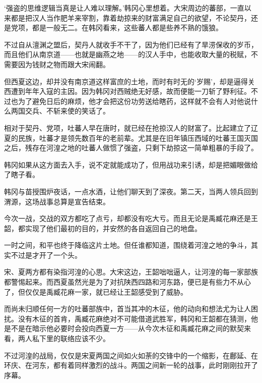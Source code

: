 ‘强盗的思维逻辑当真是让人难以理解。’韩冈心里想着。大宋周边的蕃部，一直以来都是把汉人当作肥羊来宰割，靠着劫掠来的财富满足自己的欲望，不论契丹，还是党项，都是一般无二。在韩冈看来，这些蕃人都是些养不熟的饿狼。

不过自从澶渊之盟后，契丹人就收手不干了，因为他们已经有了旱涝保收的岁币，而且他们从南京道——也就是幽燕之地——的汉人手中，也能收取大量的税赋，不需要因为钱财之物而跟大宋闹翻。

但西夏这边，却并没有南京道这样富庶的土地，而时有时无的‘岁赐’，却是逼得关西遭到年年入寇的主因。因为韩冈对西贼绝无好感，故而便能一刀斩了野利征。不过也为了避免日后的麻烦，他才会把这份功劳送给瞎药，这样就不会有人对他说什么两国交兵、不斩来使的笑话了。

相对于契丹、党项，吐蕃人早在唐时，就已经在抢掠汉人的财富了。比起建立了辽夏的民族，吐蕃才是领先数百年的老前辈。尤其是在旧年镇压西域的吐蕃王国灭国之后，残存在河湟之地的吐蕃人做惯了强盗，只剩下劫掠这一简单粗暴的手段了。

韩冈如果从这方面去入手，说不定就能成功了，但用战功来引诱，却是把媚眼做给了瞎子看。

韩冈与苗授围炉夜话，一点水酒，让他们聊天到了深夜。第二天，当两人领兵回到渭源，这场战事总算是宣告结束。

今次一战，交战的双方都吃了点亏，却都没有吃大亏。而且无论是禹臧花麻还是王韶，都实现了他们最初的目的，并安然的各自返回自己的地盘。

一时之间，和平也终于降临这片土地。但任谁都知道，围绕着河湟之地的争斗，其实不过是才开了一个头。

宋、夏两方都有染指河湟的心思。大宋这边，王韶咄咄逼人，让河湟的每一家部族都警惕起来。而西夏虽然光是为了对抗陕西四路和河东路，便已是有些力不从心了，但仅仅是禹臧花麻一家，就已经让王韶感受到了威胁。

而尚未归顺任何一方的吐蕃部族中，首当其冲的木征，他的动向和想法尤为让人困扰。没有木征的首肯，禹臧花麻绝对不可能借道武胜军，韩冈和王韶都在猜测，他是不是在暗示他必要时会投向西夏一方——从今次木征和禹臧花麻之间的默契来看，两人私下里的联络应该不少。

不过河湟的战局，仅仅是宋夏两国之间如火如荼的交锋中的一个缩影，在鄜延、在环庆、在河东，都有着同样激烈的战斗。两国之间新一轮的战事，此时刚刚拉开了序幕。

